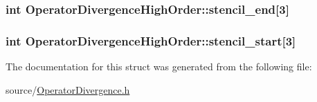 \subsubsection[{stencil\+\_\+end}]{\setlength{\rightskip}{0pt plus 5cm}int Operator\+Divergence\+High\+Order\+::stencil\+\_\+end\mbox{[}3\mbox{]}}\label{struct_operator_divergence_high_order_a6021365d2be563a3febbf4e4bad3cd28}
\hypertarget{struct_operator_divergence_high_order_acb20b4fc7f077941f6328716a1607e13}{}
\subsubsection[{stencil\+\_\+start}]{\setlength{\rightskip}{0pt plus 5cm}int Operator\+Divergence\+High\+Order\+::stencil\+\_\+start\mbox{[}3\mbox{]}}\label{struct_operator_divergence_high_order_acb20b4fc7f077941f6328716a1607e13}


The documentation for this struct was generated from the following file\+:\begin{DoxyCompactItemize}
\item 
source/\hyperlink{_operator_divergence_8h}{Operator\+Divergence.\+h}\end{DoxyCompactItemize}
